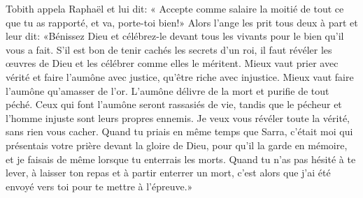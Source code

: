 Tobith appela Raphaël et lui dit:
	« Accepte comme salaire la moitié de tout ce que tu as rapporté,
	et va, porte-toi bien!»
Alors l’ange les prit tous deux à part et leur dit:
	«Bénissez Dieu et célébrez-le devant tous les vivants
		pour le bien qu’il vous a fait.
S’il est bon de tenir cachés les secrets d’un roi,
	il faut révéler les œuvres de Dieu et les célébrer comme elles le méritent.
Mieux vaut prier avec vérité et faire l’aumône avec justice,
	qu’être riche avec injustice.
Mieux vaut faire l’aumône qu’amasser de l’or.
	L’aumône délivre de la mort et purifie de tout péché.
Ceux qui font l’aumône seront rassasiés de vie,
	tandis que le pécheur et l’homme injuste sont leurs propres ennemis.
Je veux vous révéler toute la vérité, sans rien vous cacher. 
Quand tu priais en même temps que Sarra,
	c’était moi qui présentais votre prière devant la gloire de Dieu,
		pour qu’il la garde en mémoire,
	et je faisais de même lorsque tu enterrais les morts.
Quand tu n’as pas hésité à te lever,
		à laisser ton repas et à partir enterrer un mort,
	c’est alors que j’ai été envoyé vers toi pour te mettre à l’épreuve.»
